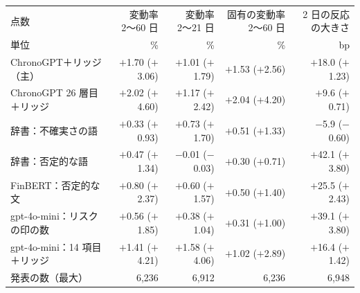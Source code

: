 \begin{tabular}{@{}lrrrr@{}}
\toprule
点数 & 変動率 2〜60 日 & 変動率 2〜21 日 & 固有の変動率 2〜60 日 & 2 日の反応の大きさ \\
単位 & \% & \% & \% & bp \\
\midrule
ChronoGPT＋リッジ（主） & $+$1.70 ($+$3.06) & $+$1.01 ($+$1.79) & $+$1.53 ($+$2.56) & $+$18.0 ($+$1.23) \\
ChronoGPT 26 層目＋リッジ & $+$2.02 ($+$4.60) & $+$1.17 ($+$2.42) & $+$2.04 ($+$4.20) & $+$9.6 ($+$0.71) \\
辞書：不確実さの語 & $+$0.33 ($+$0.93) & $+$0.73 ($+$1.70) & $+$0.51 ($+$1.33) & $-$5.9 ($-$0.60) \\
辞書：否定的な語 & $+$0.47 ($+$1.34) & $-$0.01 ($-$0.03) & $+$0.30 ($+$0.71) & $+$42.1 ($+$3.80) \\
FinBERT：否定的な文 & $+$0.80 ($+$2.37) & $+$0.60 ($+$1.57) & $+$0.50 ($+$1.40) & $+$25.5 ($+$2.43) \\
gpt-4o-mini：リスクの印の数 & $+$0.56 ($+$1.85) & $+$0.38 ($+$1.04) & $+$0.31 ($+$1.00) & $+$39.1 ($+$3.80) \\
gpt-4o-mini：14 項目＋リッジ & $+$1.41 ($+$4.21) & $+$1.58 ($+$4.06) & $+$1.02 ($+$2.89) & $+$16.4 ($+$1.42) \\
\midrule
発表の数（最大） & 6,236 & 6,912 & 6,236 & 6,948 \\
\bottomrule
\end{tabular}
